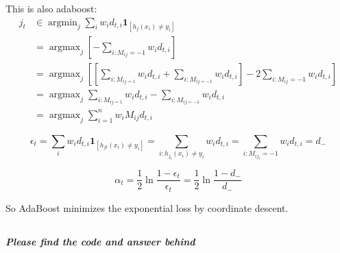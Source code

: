 \documentclass{article}
\begin{document}
This is also adaboost:
\begin{equation}\begin{aligned}
j_{t} & \in \operatorname{argmin}_{j} \sum_{i} w_{i} d_{t, i}  \mathbf{1}_{\left[h_{j}\left(x_{i}\right) \neq y_{i}\right]} \\
&=\operatorname{argmax}_{j}\left[-\sum_{i: M_{i j}=-1} w_{i} d_{t, i}\right]\\
&=\operatorname{argmax}_{j}\left[\left[\sum_{i: M_{i j=1}} w_{i} d_{t, i}+\sum_{i: M_{i j=-1}} w_{i}d_{t, i}\right]-2 \sum_{i: M_{i j}=-1}  w_{i}d_{t, i}\right] \\
&=\operatorname{argmax}_{j} \sum_{i: M_{i j=1}}  w_{i}d_{t, i}-\sum_{i: M_{i j=-1}} w_{i}d_{t, i}\\
&=  \operatorname{argmax}_{j} \sum_{i=1}^{n} w_{i} M_{i j} d_{t, i}
\end{aligned}\end{equation}

\begin{equation}\epsilon_{t}=\sum_{i} w_{i}d_{t, i} \mathbf{1}_{\left[h_{j t}\left(x_{i}\right) \neq y_{i}\right]}=\sum_{i: h_{j_{t}}\left(x_{i}\right) \neq y_{i}} w_{i}d_{t, i}=\sum_{i: M_{i j_{t}}=-1} w_{i}d_{t, i}=d_{-}\end{equation}

\begin{equation}\alpha_{t}=\frac{1}{2} \ln \frac{1-\epsilon_{t}}{\epsilon_{t}}=\frac{1}{2} \ln \frac{1-d_{-}}{d_{-}}\end{equation}

So AdaBoost minimizes the exponential loss by coordinate descent.
\subsection{}
\textbf{\textit{Please find the code and answer behind}}
\end{document}
